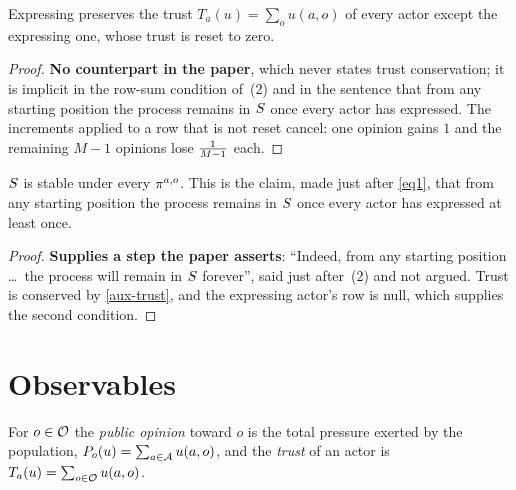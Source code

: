 \begin{lemma}
  \label{aux-trust}
  \leanok
  Expressing preserves the trust $T_a(u) = \sum_o u(a,o)$ of every actor except
  the expressing one, whose trust is reset to zero.
\end{lemma}
\begin{proof}
  \leanok
  \textbf{No counterpart in the paper}, which never states trust
  conservation; it is implicit in the row-sum condition of~(2) and in the
  sentence that from any starting position the process remains in $S$
  once every actor has expressed.
  The increments applied to a row that is not reset cancel: one opinion gains
  $1$ and the remaining $M-1$ opinions lose $\tfrac{1}{M-1}$ each.
\end{proof}

\begin{lemma}
  \label{aux-state-stable}
  \leanok
  $S$ is stable under every $\pi^{a,o}$.  This is the claim, made
  just after \ref{eq1}, that from any starting position the process remains in
  $S$ once every actor has expressed at least once.
\end{lemma}
\begin{proof}
  \leanok
  \textbf{Supplies a step the paper asserts}: ``Indeed, from any starting
  position \dots\ the process will remain in $S$ forever'', said just
  after~(2) and not argued.  Trust is conserved by \ref{aux-trust}, and the
  expressing actor's row is null, which supplies the second condition.
\end{proof}

\section{Observables}

\begin{definition}
  \label{aux-observables}
  \leanok
  For $o \in \mathcal{O}$ the \emph{public opinion} toward $o$ is the total
  pressure exerted by the population, $P_o(u) = \sum_{a \in \mathcal{A}} u(a,o)$,
  and the \emph{trust} of an actor is $T_a(u) = \sum_{o \in \mathcal{O}} u(a,o)$.
\end{definition}


